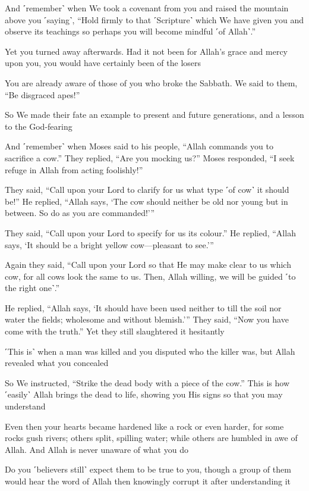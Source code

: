 And ˹remember˺ when We took a covenant from you and raised the mountain above you ˹saying˺, “Hold firmly to that ˹Scripture˺ which We have given you and observe its teachings so perhaps you will become mindful ˹of Allah˺.”

Yet you turned away afterwards. Had it not been for Allah’s grace and mercy upon you, you would have certainly been of the losers

You are already aware of those of you who broke the Sabbath. We said to them, “Be disgraced apes!”

So We made their fate an example to present and future generations, and a lesson to the God-fearing

And ˹remember˺ when Moses said to his people, “Allah commands you to sacrifice a cow.” They replied, “Are you mocking us?” Moses responded, “I seek refuge in Allah from acting foolishly!”

They said, “Call upon your Lord to clarify for us what type ˹of cow˺ it should be!” He replied, “Allah says, ‘The cow should neither be old nor young but in between. So do as you are commanded!’”

They said, “Call upon your Lord to specify for us its colour.” He replied, “Allah says, ‘It should be a bright yellow cow—pleasant to see.’”

Again they said, “Call upon your Lord so that He may make clear to us which cow, for all cows look the same to us. Then, Allah willing, we will be guided ˹to the right one˺.”

He replied, “Allah says, ‘It should have been used neither to till the soil nor water the fields; wholesome and without blemish.’” They said, “Now you have come with the truth.” Yet they still slaughtered it hesitantly

˹This is˺ when a man was killed and you disputed who the killer was, but Allah revealed what you concealed

So We instructed, “Strike the dead body with a piece of the cow.” This is how ˹easily˺ Allah brings the dead to life, showing you His signs so that you may understand

Even then your hearts became hardened like a rock or even harder, for some rocks gush rivers; others split, spilling water; while others are humbled in awe of Allah. And Allah is never unaware of what you do

Do you ˹believers still˺ expect them to be true to you, though a group of them would hear the word of Allah then knowingly corrupt it after understanding it

